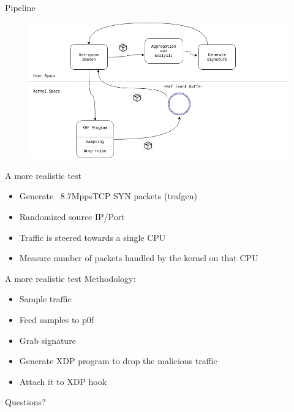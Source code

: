 \documentclass{beamer}
\begin{document}
\begin{frame}{Pipeline}
  \begin{figure}
    \includegraphics[width=\linewidth]{./ddos.png}
  \end{figure}
\end{frame}

\begin{frame}{A more realistic test}
  \begin{itemize}
    \item Generate ~8.7Mpps\footnotemark TCP SYN packets (trafgen)
    \item Randomized source IP/Port
    \item Traffic is steered towards a single CPU
    \item Measure number of packets handled by the kernel on that CPU
  \end{itemize}
\end{frame}

\begin{frame}{A more realistic test}
  Methodology:
  \begin{itemize}
    \item Sample traffic
    \item Feed samples to p0f
    \item Grab signature
    \item Generate XDP program to drop the malicious traffic
    \item Attach it to XDP hook
  \end{itemize}
\end{frame}

\begin{frame}[plain]
\end{frame}

\begin{frame}{}
  \begin{center}
    \Huge Questions?
  \end{center}

\end{frame}
\end{document}
